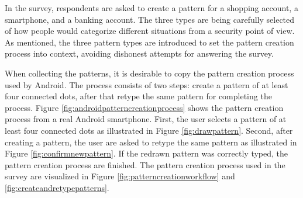     In the survey, respondents are asked to create a pattern for a shopping account, a smartphone, and a banking account. The three types are being carefully selected of how people would categorize different situations from a security point of view. As mentioned, the three pattern types are introduced to set the pattern creation process into context, avoiding dishonest attempts for answering the survey. 

    When collecting the patterns, it is desirable to copy the pattern creation process used by Android. The process consists of two steps: create a pattern of at least four connected dots, after that retype the same pattern for completing the process. Figure \ref{fig:androidpatterncreationprocess} shows the pattern creation process from a real Android smartphone. First, the user selects a pattern of at least four connected dots as illustrated in Figure \ref{fig:drawpattern}. Second, after creating a pattern, the user are asked to retype the same pattern as illustrated in Figure \ref{fig:confirmnewpattern}. If the redrawn pattern was correctly typed, the pattern creation process are finished. The pattern creation process used in the survey are visualized in Figure \ref{fig:patterncreationworkflow} and \ref{fig:createandretypepatterns}.

